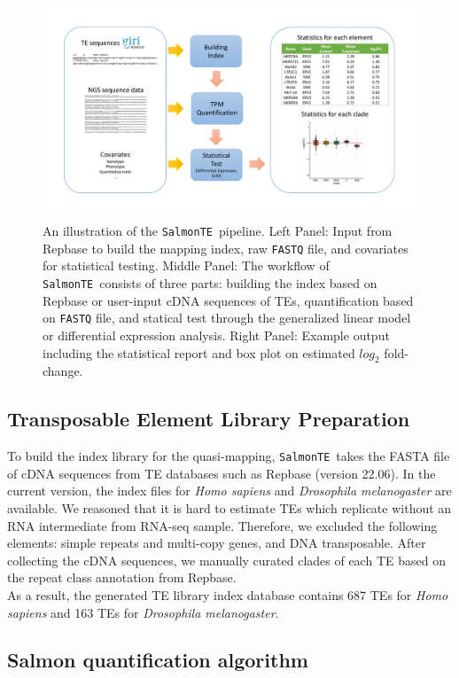 \documentclass[wsdraft]{ws-procs11x85}
\newcommand{\SalmonTE}{\texttt{SalmonTE}}
\begin{document}
\begin{figure}[h]
\centerline{
\includegraphics[width=14cm]{fig1.pdf}
}
\caption{An illustration of the \SalmonTE~pipeline. Left Panel: Input from Repbase to build the mapping index, raw \texttt{FASTQ} file, and covariates for statistical testing.  Middle Panel: The workflow of \SalmonTE~consists of three parts: building the index based on Repbase or user-input cDNA sequences of TEs, quantification based on \texttt{FASTQ} file, and statical test through the generalized linear model or differential expression analysis. Right Panel: Example output including the statistical report and box plot on estimated $log_2$ fold-change.}
\label{aba:fig1}
\end{figure}

\subsection{Transposable Element Library Preparation}
To build the index library for the quasi-mapping, \SalmonTE~takes the FASTA file of cDNA sequences from TE databases such as Repbase (version 22.06)\cite{repbase}. In the current version, the index files for \textit{Homo sapiens} and \textit{Drosophila melanogaster} are available. 
We reasoned that it is hard to estimate TEs which replicate without an RNA intermediate from RNA-seq sample. Therefore, we excluded the following elements: simple repeats and multi-copy genes, and DNA transposable. After collecting the cDNA sequences, we manually curated clades of each TE based on the repeat class annotation from Repbase. \\
As a result, the generated TE library index database contains 687 TEs for \textit{Homo sapiens} and 163 TEs for \textit{Drosophila melanogaster}.

\subsection{Salmon quantification algorithm}
\end{document}
